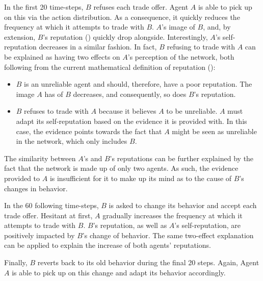 In the first 20 time-steps, $B$ refuses each trade offer. Agent $A$ is able to pick up on this via the action distribution. As a consequence, it quickly reduces the frequency at which it attempts to trade with $B$. $A$'s image of $B$, and, by extension, $B$'s reputation () quickly drop alongside. Interestingly, $A$'s self-reputation decreases in a similar fashion. In fact, $B$ refusing to trade with $A$ can be explained as having two effects on $A$'s perception of the network, both following from the current mathematical definition of reputation ():
\begin{itemize}
    \item $B$ is an unreliable agent and should, therefore, have a poor reputation. The image $A$ has of $B$ decreases, and consequently, so does $B$'s reputation.
    \item $B$ refuses to trade with $A$ because it believes $A$ to be unreliable. $A$ must adapt its self-reputation based on the evidence it is provided with. In this case, the evidence points towards the fact that $A$ might be seen as unreliable in the network, which only includes $B$. 
\end{itemize}
The similarity between $A$'s and $B$'s reputations can be further explained by the fact that the network is made up of only two agents. As such, the evidence provided to $A$ is insufficient for it to make up its mind as to the cause of $B$'s changes in behavior.



In the 60 following time-steps, $B$ is asked to change its behavior and accept each trade offer. Hesitant at first, $A$ gradually increases the frequency at which it attempts to trade with $B$. $B$'s reputation, as well as $A$'s self-reputation, are positively impacted by $B$'s change of behavior. The same two-effect explanation can be applied to explain the increase of both agents' reputations.

Finally, $B$ reverts back to its old behavior during the final 20 steps. Again, Agent $A$ is able to pick up on this change and adapt its behavior accordingly.

